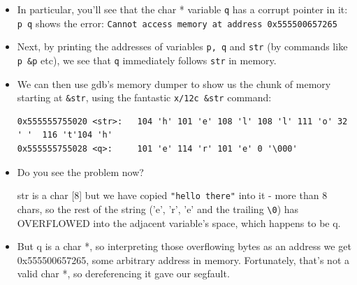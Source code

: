 \documentclass[aspectratio=169]{beamer}
\newcommand{\pitem}{\pause \item}
\begin{document}
\begin{frame}[fragile]
    \begin{itemize}
      \item
      In particular, you'll see that the char * variable \verb+q+ has a corrupt pointer in it:
        \verb'p q' shows the error:
	\verb+Cannot access memory at address 0x555500657265+

      \pitem
      Next, by printing the addresses of variables \verb+p, q+ and \verb+str+
      (by commands like \verb+p &p+ etc), we see that \verb+q+
      \alert{immediately follows} \verb+str+ in memory.

      \pitem
      We can then use gdb's \alert{memory dumper} to show us the chunk of memory
      starting at \verb+&str+, using the fantastic \verb+x/12c &str+ command:

	{\tiny
	\begin{verbatim}
0x555555755020 <str>:   104 'h' 101 'e' 108 'l' 108 'l' 111 'o' 32 ' '  116 't'104 'h'
0x555555755028 <q>:     101 'e' 114 'r' 101 'e' 0 '\000'
	\end{verbatim}
	}

      \item
      Do you see the problem now?

      \pause
      str is a \alert{char [8]} but we have copied \verb+"hello there"+
      into it - more than 8 chars,
      \pause
      so the rest of the string
      ('e', 'r', 'e' and the trailing \verb+\0+)
      has OVERFLOWED into the adjacent variable's space, which happens to be
      \alert{q}.

      \pitem
      But q is a char *, so interpreting those overflowing bytes as an address we get
      0x555500657265, some arbitrary address in memory.
      Fortunately, that's not a valid char *, so dereferencing it gave our segfault.

    \end{itemize}
\end{frame}
\end{document}
